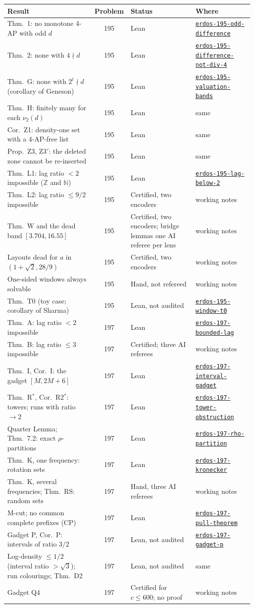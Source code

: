 \documentclass[11pt,letterpaper]{article}
\newcommand{\Z}{\mathbb{Z}}
\newcommand{\N}{\mathbb{N}}
\newcommand{\nut}{\nu_2}
\newcommand{\repo}[1]{\href{https://github.com/Alex-lop/#1}{\nolinkurl{#1}}}
\begin{document}
{\small\renewcommand{\arraystretch}{1.25}
\begin{longtable}{L{2.3in}cL{1.55in}L{1.45in}}
\toprule
Result & Problem & Status & Where \\
\midrule
\endhead
\bottomrule
\endfoot
Thm.~1: no monotone 4-AP with odd $d$ & 195 & Lean & \repo{erdos-195-odd-difference} \\
Thm.~2: none with $4 \nmid d$ & 195 & Lean & \repo{erdos-195-difference-not-div-4} \\
Thm.~G: none with $2^t \nmid d$ (corollary of Geneson) & 195 & Lean & \repo{erdos-195-valuation-bands} \\
Thm.~H: finitely many for each $\nut(d)$ & 195 & Lean & same \\
Cor.~Z1: density-one set with a 4-AP-free list & 195 & Lean & same \\
Prop.~Z3, Z3$'$: the deleted zone cannot be re-inserted & 195 & Lean & same \\
Thm.~L1: lag ratio $< 2$ impossible ($\Z$ and $\N$) & 195 & Lean & \repo{erdos-195-lag-below-2} \\
Thm.~L2: lag ratio $\le 9/2$ impossible & 195 & Certified, two encoders & working notes \\
Thm.~W and the dead band $[3.704, 16.55]$ & 195 & Certified, two encoders; bridge lemmas one AI referee per
lens & working notes \\
Layouts dead for $a$ in $(1+\sqrt2, 28/9)$ & 195 & Certified, two encoders & working notes \\
One-sided windows always solvable & 195 & Hand, not refereed & working notes \\
Thm.~T0 (toy case; corollary of Sharma) & 195 & Lean, not audited & \repo{erdos-195-window-t0} \\
\midrule
Thm.~A: lag ratio $< 2$ impossible & 197 & Lean & \repo{erdos-197-bounded-lag} \\
Thm.~B: lag ratio $\le 3$ impossible & 197 & Certified; three AI referees & working notes \\
Thm.~I, Cor.~I: the gadget $[M, 2M+6]$ & 197 & Lean & \repo{erdos-197-interval-gadget} \\
Thm.~R$^*$, Cor.~R2$^*$: towers; runs with ratio $\to 2$ & 197 & Lean & \repo{erdos-197-tower-obstruction} \\
Quarter Lemma; Thm.~7.2: exact $\rho$-partitions & 197 & Lean & \repo{erdos-197-rho-partition} \\
Thm.~K, one frequency: rotation sets & 197 & Lean & \repo{erdos-197-kronecker} \\
Thm.~K, several frequencies; Thm.~RS: random sets & 197 & Hand, three AI referees & working notes \\
M-cut; no common complete prefixes (CP) & 197 & Lean & \repo{erdos-197-pull-theorem} \\
Gadget P, Cor.~P: intervals of ratio $3/2$ & 197 & Lean, not audited & \repo{erdos-197-gadget-p} \\
Log-density $\le 1/2$ (interval ratio $>\sqrt3$); run colourings; Thm.~D2 & 197 & Lean, not audited & same \\
Gadget Q4 & 197 & Certified for $c \le 600$; no proof & working notes \\
\end{longtable}
}
\end{document}
